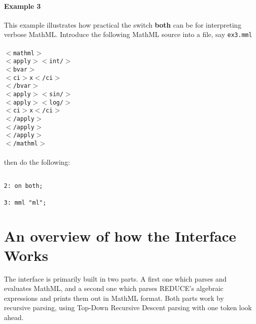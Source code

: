 \documentclass{article}
\begin{document}
\paragraph{Example 3} This example illustrates how practical the switch
{\bf both} can be for interpreting verbose MathML.
Introduce the following MathML source into a file, say {\tt ex3.mml}\\
\\
{\tt $<$mathml$>$\\
\hspace*{1mm}  $<$apply$>$$<$int/$>$\\
\hspace*{5mm}    $<$bvar$>$\\
\hspace*{9mm}      $<$ci$>$x$<$/ci$>$\\
\hspace*{5mm}    $<$/bvar$>$\\
\hspace*{5mm}    $<$apply$>$$<$sin/$>$\\
\hspace*{9mm}      $<$apply$>$$<$log/$>$\\
\hspace*{13mm}       $<$ci$>$x$<$/ci$>$\\
\hspace*{9mm}      $<$/apply$>$\\
\hspace*{5mm}    $<$/apply$>$\\
\hspace*{1mm}  $<$/apply$>$\\
$<$/mathml$>$ \\}
\\
then do the following:

\begin{verbatim}

2: on both;

3: mml "ml";

\end{verbatim}

\section{An overview of how the Interface Works}

The interface is primarily built in two parts. A first one which parses
and evaluates MathML, and a second one which parses REDUCE's algebraic
expressions and prints them out in MathML format. Both parts work by
recursive parsing, using Top-Down Recursive Descent parsing with one token
look ahead.
\end{document}
